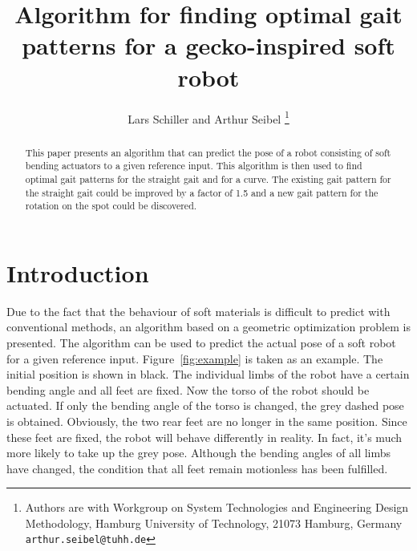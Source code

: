 \documentclass[letterpaper,10pt,conference]{ieeeconf}  %
\title{\LARGE \bf
Algorithm for finding optimal gait patterns for a gecko-inspired soft robot
}
\author{Lars Schiller and Arthur Seibel%
\thanks{Authors are with Workgroup on System Technologies and Engineering Design Methodology, Hamburg University of Technology, 21073 Hamburg, Germany
			 {\tt\small arthur.seibel@tuhh.de}
				}%
}
\begin{document}
\maketitle
\thispagestyle{empty}
\pagestyle{empty}


\begin{abstract}

This paper presents an algorithm that can predict the pose of a robot consisting of soft bending actuators to a given reference input.
This algorithm is then used to find optimal gait patterns for the straight gait and for a curve.
The existing gait pattern for the straight gait could be improved by a factor of 1.5 and a new gait pattern for the rotation on the spot could be discovered.

\end{abstract}



\newcommand{\mbeq}{\overset{!}{=}}

\makeatletter
\renewcommand*\env@matrix[1][*\c@MaxMatrixCols c]{%
  \hskip -\arraycolsep
  \let\@ifnextchar\new@ifnextchar
  \array{#1}}
\makeatother




\section{Introduction}

Due to the fact that the behaviour of soft materials is difficult to predict with conventional methods, an algorithm based on a geometric optimization problem is presented.
The algorithm can be used to predict the actual pose of a soft robot for a given reference input.
Figure~\ref{fig:example} is taken as an example. The initial position is shown in black. 
The individual limbs of the robot have a certain bending angle and all feet are fixed.
Now the torso of the robot should be actuated. 
If only the bending angle of the torso is changed, the grey dashed pose is obtained. 
Obviously, the two rear feet are no longer in the same position. 
Since these feet are fixed, the robot will behave differently in reality. 
In fact, it's much more likely to take up the grey pose. 
Although the bending angles of all limbs have changed, the condition that all feet remain motionless has been fulfilled.
\end{document}
